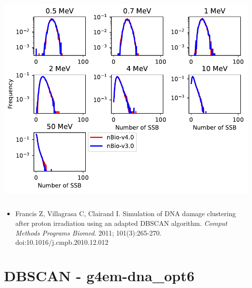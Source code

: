 \documentclass[aspectratio=1610]{beamer}
\begin{document}
\begin{frame}{\secname}
\begin{columns}
\begin{column}{0.6\linewidth}
   \includegraphics[width=\textwidth]{./DBSCAN/DBSCAN1_g4em-dna_opt4}
  \end{column}
 \end{columns}
\begin{itemize}
\item \tiny{Francis Z, Villagrasa C, Clairand I. Simulation of DNA damage clustering after proton irradiation using an adapted DBSCAN algorithm. \textit{Comput Methods Programs Biomed}. 2011; 101(3):265-270. doi:10.1016/j.cmpb.2010.12.012}
\end{itemize}
\end{frame}

\section{DBSCAN - g4em-dna\_opt6}
\end{document}

